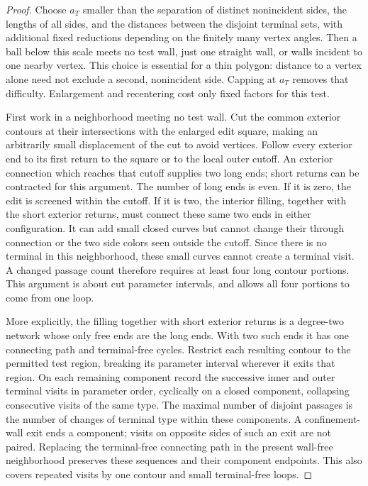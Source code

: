 \begin{proof}
Choose $a_T$ smaller than the separation of distinct nonincident
sides, the lengths of all sides, and the distances between the
disjoint terminal sets, with additional fixed reductions depending
on the finitely many vertex angles.  Then a ball below this scale
meets no test wall, just one straight wall, or walls incident to
one nearby vertex.  This choice is essential for a thin polygon:
distance to a vertex alone need not exclude a second, nonincident
side.  Capping at $a_T$ removes that difficulty.  Enlargement and
recentering cost only fixed factors for this test.

First work in a neighborhood meeting no test wall.  Cut the common
exterior contours at their intersections with the enlarged edit
square, making an arbitrarily small displacement of the cut to
avoid vertices.  Follow every exterior end to its first return to
the square or to the local outer cutoff.  An exterior connection
which reaches that cutoff supplies two long ends; short returns
can be contracted for this argument.  The number of long ends
is even.  If it is zero, the edit is screened within the cutoff.
If it is two, the interior filling, together with the short
exterior returns, must connect these same two ends in either
configuration.  It can add small closed curves but cannot change
their through connection or the two side colors seen outside the
cutoff.  Since there is no terminal in this neighborhood, these
small curves cannot create a terminal visit.  A changed passage
count therefore requires at least four long contour portions.
This argument is about cut parameter intervals, and allows all
four portions to come from one loop.

More explicitly, the filling together with short exterior returns
is a degree-two network whose only free ends are the long ends.
With two such ends it has one connecting path and terminal-free
cycles.  Restrict each resulting contour to the permitted test region,
breaking its parameter interval wherever it exits that region.  On each
remaining component record the successive inner and outer terminal
visits in parameter order, cyclically on a closed component, collapsing
consecutive visits of the same type.  The maximal
number of disjoint passages is the number of changes of terminal type
within these components.  A confinement-wall exit ends a component;
visits on opposite sides of such an exit are not paired.  Replacing
the terminal-free connecting path in the present wall-free neighborhood
preserves these sequences and their component endpoints.  This also
covers repeated visits by one contour and small terminal-free loops.


\end{proof}

